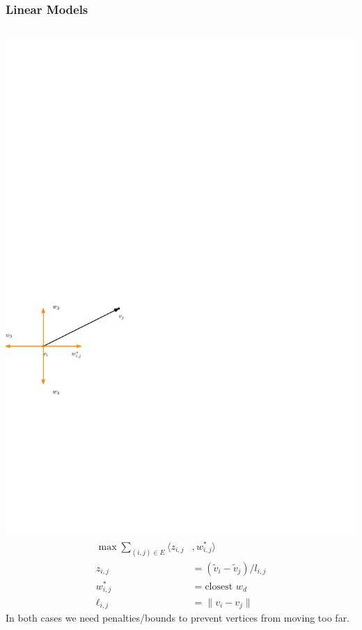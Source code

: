 \documentclass{beamer}
\begin{document}
\begin{frame}
  \frametitle{Linear Models}
  \begin{columns}
    \includegraphics[width=\columnwidth]{snapping2.pdf}
    \begin{align*}
       \max \sum_{(i,j) \in E} \langle z_{i,j} &, w^*_{i,j} \rangle\\
      z_{i,j} & = (\tilde{v}_{i} - \tilde{v}_{j})/l_{i,j}\\
       w^*_{i,j}&= \text{closest $w_d$}\\
       \ell_{i,j} &= \| v_i - v_j\|
    \end{align*}
    In both cases we need penalties/bounds to prevent vertices from
    moving too far.
  \end{columns}
\end{frame}
\end{document}
